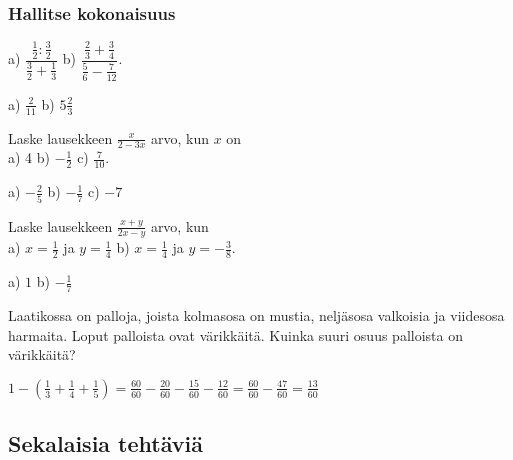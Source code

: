 \subsubsection*{Hallitse kokonaisuus}

\begin{tehtava}
a) $\dfrac{\frac{1}{2}:\frac{3}{2}}{\frac{3}{2}+\frac{1}{3}}$ \qquad b) $\dfrac{\frac{2}{3}+\frac{3}{4}}{\frac{5}{6}-\frac{7}{12}}$.
\begin{vastaus}
a) $\frac{2}{11}$ \qquad b) $5\frac{2}{3}$
\end{vastaus}
\end{tehtava}

\begin{tehtava}
Laske lausekkeen $\frac{x}{2-3x}$ arvo, kun $x$ on \\ a) 4 \qquad b) $-\frac{1}{2}$ \qquad c) $\frac{7}{10}$.
\begin{vastaus}
a) $-\frac{2}{5}$ \qquad b) $-\frac{1}{7}$ \qquad c) $-7$
\end{vastaus}
\end{tehtava}

\begin{tehtava}
Laske lausekkeen $\frac{x+y}{2x-y}$ arvo, kun \\ a) $x=\frac{1}{2}$ ja $y= \frac{1}{4}$ \qquad b) $x=\frac{1}{4}$ ja $y= -\frac{3}{8}$.
\begin{vastaus}
a) $1$ \qquad b) $-\frac{1}{7}$
\end{vastaus}
\end{tehtava}

    \begin{tehtava} %
        Laatikossa on palloja, joista kolmasosa on mustia, neljäsosa
        valkoisia ja viidesosa harmaita. Loput palloista ovat värikkäitä.
        Kuinka suuri osuus palloista on värikkäitä?
        
        \begin{vastaus}
            $1-(\frac{1}{3}+\frac{1}{4}+\frac{1}{5})
            = \frac{60}{60}-\frac{20}{60}-\frac{15}{60}-\frac{12}{60}
            = \frac{60}{60}-\frac{47}{60}
            = \frac{13}{60}$
        \end{vastaus}
    \end{tehtava}


\subsection*{Sekalaisia tehtäviä}

